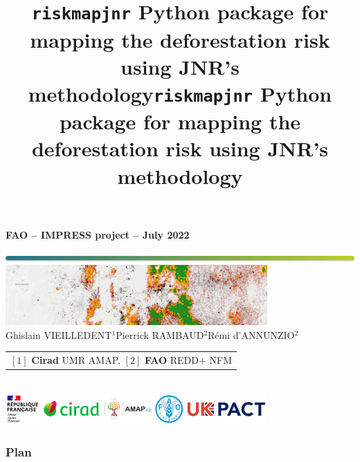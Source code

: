 \documentclass[10pt,table,dvipsnames,compress]{beamer}
\date{}
\title{\texttt{riskmapjnr} Python package for mapping the deforestation risk using JNR's methodology}
\title[riskmapjnr]{\texttt{riskmapjnr} Python package for mapping the deforestation risk using JNR's methodology}
\newif\ifplacelogo %
\begin{document}
{
  \begin{frame}
  
  \begin{center}
  \small{\textbf{FAO -- IMPRESS project -- July 2022}}
  \end{center}
  \vspace{-1cm}
  \titlepage %
  \vspace{-3.5cm}
  \begin{center}
    \includegraphics[width=\textwidth]{figs/Barre_couleur}\\
    \vspace{0.5cm}
    \includegraphics[width=10cm]{figs/riskmapjnr-example}\\
    \vspace{0.3cm}
    \small{Ghislain VIEILLEDENT$^{1}$\hspace{0.25cm}Pierrick RAMBAUD$^{2}$\hspace{0.25cm}Rémi d'ANNUNZIO$^{2}$}\\
    \vspace{0.15cm}
    {\scriptsize
      \begin{tabular}{l}
        $[1]$ \textbf{Cirad} UMR AMAP, $[2]$ \textbf{FAO} REDD$+$ NFM
      \end{tabular}
    }\\
    \vspace{0.3cm}
    \includegraphics[width=0.75\textwidth]{figs/partners_logos}
    
  \end{center}
  \end{frame}
}


\placelogotrue
\begin{frame}
  \frametitle{Plan}
  \begin{columns}[c]
    \begin{column}{0.5\textwidth}
      \tableofcontents[sections=1]
      \vspace{0.5cm}
      \tableofcontents[sections=2]
    \end{column}
    \begin{column}{0.5\textwidth}
        \tableofcontents[sections=3]
        \vspace{0.5cm}
        \tableofcontents[sections=4]
    \end{column}
  \end{columns}
\end{frame}
\placelogofalse
\end{document}

